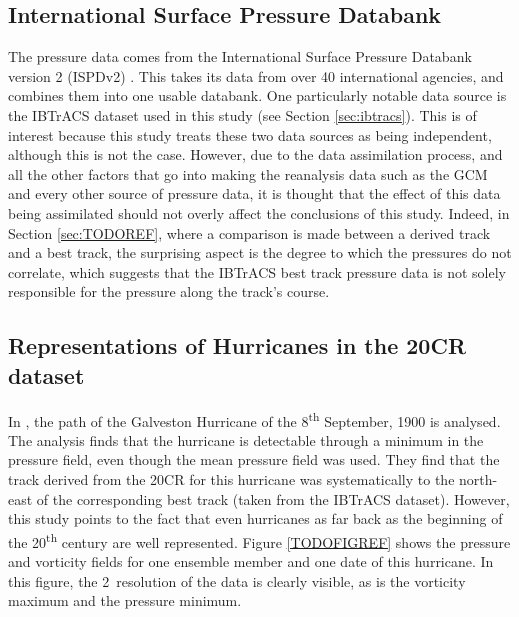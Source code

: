 \documentclass[pdftex,12pt,a4paper]{report}
\newcommand{\ts}{\textsuperscript}
\begin{document}
\subsection{International Surface Pressure Databank}
The pressure data comes from the International Surface Pressure Databank version 2 (ISPDv2)
\parencite{TODOCITE}. This takes its data from over 40 international agencies, and combines them
into one usable databank. One particularly notable data source is the IBTrACS dataset used in this
study (see Section \ref{sec:ibtracs}). This is of interest because this study treats these two data
sources as being independent, although this is not the case. However, due to the data assimilation
process, and all the other factors that go into making the reanalysis data such as the GCM and every
other source of pressure data, it is thought that the effect of this data being assimilated should
not overly affect the conclusions of this study. Indeed, in Section \ref{sec:TODOREF}, where a
comparison is made between a derived track and a best track, the surprising aspect is the degree to
which the pressures do not correlate, which suggests that the IBTrACS best track pressure data is
not solely responsible for the pressure along the track's course.


\subsection{Representations of Hurricanes in the 20CR dataset}

In \textcite{neff2013}, the path of the Galveston Hurricane of the 8\ts{th} September, 1900 is
analysed. The analysis finds that the hurricane is detectable through a minimum in the pressure
field, even though the mean pressure field was used. They find that the track derived from the 20CR
for this hurricane was systematically to the north-east of the corresponding best track (taken from
the IBTrACS dataset). However, this study points to the fact that even hurricanes as far back as the
beginning of the 20\ts{th} century are well represented. Figure \ref{TODOFIGREF} shows the pressure
and vorticity fields for one ensemble member and one date of this hurricane. In this figure, the
2\textdegree\ resolution of the data is clearly visible, as is the vorticity maximum and the pressure
minimum.

\end{document}
